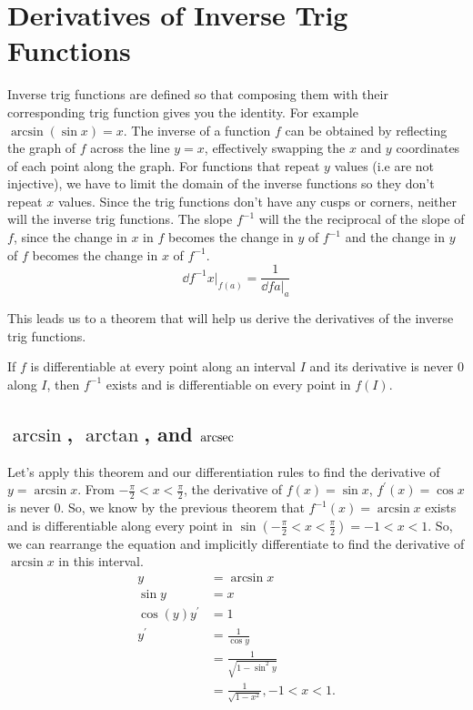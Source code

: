 \section{Derivatives of Inverse Trig Functions}
Inverse trig functions are defined so that composing them with their corresponding trig function gives you the identity.
For example $\arcsin{(\sin{x})} = x$.
The inverse of a function $f$ can be obtained by reflecting the graph of $f$ across the line $y=x$, effectively swapping the $x$ and $y$ coordinates of each point along the graph.
For functions that repeat $y$ values (i.e are not injective), we have to limit the domain of the inverse functions so they don't repeat $x$ values.
Since the trig functions don't have any cusps or corners, neither will the inverse trig functions.
The slope $f^{-1}$ will the the reciprocal of the slope of $f$, since the change in $x$ in $f$ becomes the change in $y$ of $f^{-1}$ and the change in $y$ of $f$ becomes the change in $x$ of $f^{-1}$.
\begin{equation*}
	\dd{f^{-1}}{x}\biggr\rvert_{f(a)} = \frac{1}{\dd{f}{a}\bigr\rvert_{a}}
\end{equation*}


This leads us to a theorem that will help us derive the derivatives of the inverse trig functions.
\begin{theorem}
	If $f$ is differentiable at every point along an interval $I$ and its derivative is never 0 along $I$, then $f^{-1}$ exists and is differentiable on every point in $f(I)$.
\end{theorem}

\subsection{$\arcsin$, $\arctan$, and $\operatorname{arcsec}$}
Let's apply this theorem and our differentiation rules to find the derivative of $y = \arcsin{x}$.
From $-\frac{\pi}{2} < x < \frac{\pi}{2}$, the derivative of $f(x)=\sin{x}$, $f^\prime(x)=\cos{x}$ is never 0.
So, we know by the previous theorem that $f^{-1}(x)=\arcsin{x}$ exists and is differentiable along every point in $\sin(-\frac{\pi}{2} < x < \frac{\pi}{2}) = -1 < x < 1$.
So, we can rearrange the equation and implicitly differentiate to find the derivative of $\arcsin{x}$ in this interval.
\begin{align*}
	y &= \arcsin{x} \\
	\sin{y} &= x \\
	\cos{(y)}y^\prime &= 1 \\
	y^\prime &= \frac{1}{\cos{y}} \\
	&= \frac{1}{\sqrt{1-\sin^2{y}}} \\
	&= \frac{1}{\sqrt{1-x^2}}, -1 < x < 1.
\end{align*}



